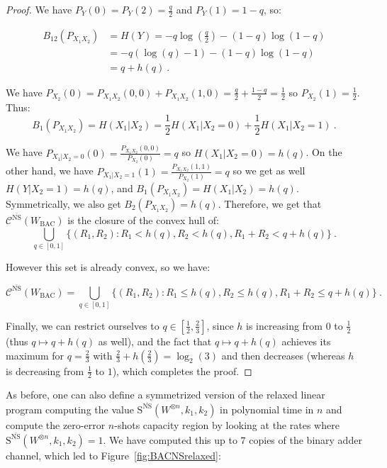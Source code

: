 \documentclass[11pt]{article}
\theoremstyle{definition}
\theoremstyle{remark}
\begin{document}
\begin{proof}
     We have $P_{Y}(0) = P_{Y}(2) = \frac{q}{2}$ and $P_{Y}(1) = 1-q$, so:

    \begin{equation}
      \begin{aligned}
        B_{12}(P_{X_1X_2}) &= H(Y) = -q\log(\frac{q}{2})-\left(1-q\right)\log(1-q)\\
        &= -q\left(\log(q)-1\right)-\left(1-q\right)\log(1-q)\\
        &= q+h\left(q\right) \ .
      \end{aligned}
    \end{equation}
    
    We have $P_{X_2}(0) = P_{X_1X_2}(0,0)+P_{X_1X_2}(1,0) = \frac{q}{2}+\frac{1-q}{2} = \frac{1}{2}$ so $P_{X_2}(1) = \frac{1}{2}$. Thus:
    \[ B_1(P_{X_1X_2}) = H(X_1|X_2) = \frac{1}{2}H(X_1|X_2=0)+\frac{1}{2}H(X_1|X_2=1) \ .\]
    
    We have $P_{X_1|X_2=0}(0)=\frac{P_{X_1X_2}(0,0)}{P_{X_2}(0)} = q$ so $H(X_1|X_2=0)=h\left(q\right)$. On the other hand, we have $P_{X_1|X_2=1}(1)=\frac{P_{X_1X_2}(1,1)}{P_{X_2}(1)} = q$ so we get as well $H(Y|X_2=1)=h\left(q\right)$, and $B_1(P_{X_1X_2}) = H(X_1|X_2) = h\left(q\right)$. Symmetrically, we also get $B_2(P_{X_1X_2}) = h\left(q\right)$. Therefore, we get that $\mathcal{C}^{\overline{\mathrm{NS}}}(W_{\text{BAC}})$ is the closure of the convex hull of:
    \[\bigcup_{q \in [0,1]}\{ (R_1,R_2) : R_1 < h\left(q\right), R_2 < h\left(q\right), R_1+R_2 < q+h\left(q\right)\} \ .\]

    However this set is already convex, so we have:

    \[\mathcal{C}^{\overline{\mathrm{NS}}}(W_{\text{BAC}}) = \bigcup_{q \in [0,1]}\{ (R_1,R_2) : R_1 \leq h\left(q\right), R_2 \leq h\left(q\right), R_1+R_2 \leq q+h\left(q\right)\} \ .\]
    
    Finally, we can restrict ourselves to $q \in \left[\frac{1}{2},\frac{2}{3}\right]$, since $h$ is increasing from $0$ to $\frac{1}{2}$ (thus $q \mapsto q+h\left(q\right)$ as well), and the fact that $q \mapsto q+h\left(q\right)$ achieves its maximum for $q=\frac{2}{3}$ with $\frac{2}{3}+h\left(\frac{2}{3}\right)=\log_2(3)$ and then decreases (whereas $h$ is decreasing from $\frac{1}{2}$ to $1$), which completes the proof.
  \end{proof}

  As before, one can also define a symmetrized version of the relaxed linear program computing the value $\mathrm{S}^{\overline{\mathrm{NS}}}(W^{\otimes n},k_1,k_2)$ in polynomial time in $n$ and compute the zero-error $n$-shots capacity region by looking at the rates where $\mathrm{S}^{\overline{\mathrm{NS}}}(W^{\otimes n},k_1,k_2)=1$. We have computed this up to $7$ copies of the binary adder channel, which led to Figure~\ref{fig:BACNSrelaxed}:
  
\end{document}
